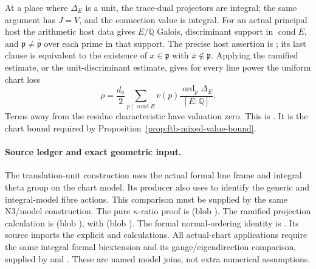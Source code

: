 At a place where \(\Delta_E\) is a unit, the trace-dual projectors are
integral; the same argument has \(J=V\), and the connection value is
integral.
For an actual principal host the arithmetic host data gives
\(E/\mathbb Q\) Galois, discriminant support in
\(\operatorname{cond}E\), and
\(\mathfrak p\ne\bar{\mathfrak p}\) over each prime in that support.
The precise host assertion is
;
its last clause is equivalent to the existence of
\(x\in\mathfrak p\) with \(\bar x\notin\mathfrak p\).
Applying the ramified estimate, or the unit-discriminant estimate,
gives for every line power the uniform chart loss
\begin{equation}\label{eq:ftb-host-chart-loss}
 \rho=\frac{d_a}{2}
  \sum_{p\mid\operatorname{cond}E}
       v(p)\frac{\operatorname{ord}_p\Delta_E}{[E:\mathbb Q]} .
\end{equation}
Terms away from the residue characteristic have valuation zero.
This is .
It is the chart bound required by
Proposition~\ref{prop:ftb-mixed-value-bound}.

\paragraph{Source ledger and exact geometric input.}
The translation-unit construction uses the actual formal line frame
and integral theta group on the chart model.
Its producer also uses
to identify the generic and integral-model fibre actions.
This comparison must be supplied by the same N3/model construction.
The pure \(\kappa\)-ratio proof is
(blob ).
The ramified projection calculation is
(blob ),
with 
(blob ).
The formal normal-ordering identity is
.
Its source imports the explicit  and
 calculations.
All actual-chart applications require the same integral formal
biextension and its gauge/eigendirection comparison, supplied by
 and
.
These are named model joins, not extra numerical assumptions.
